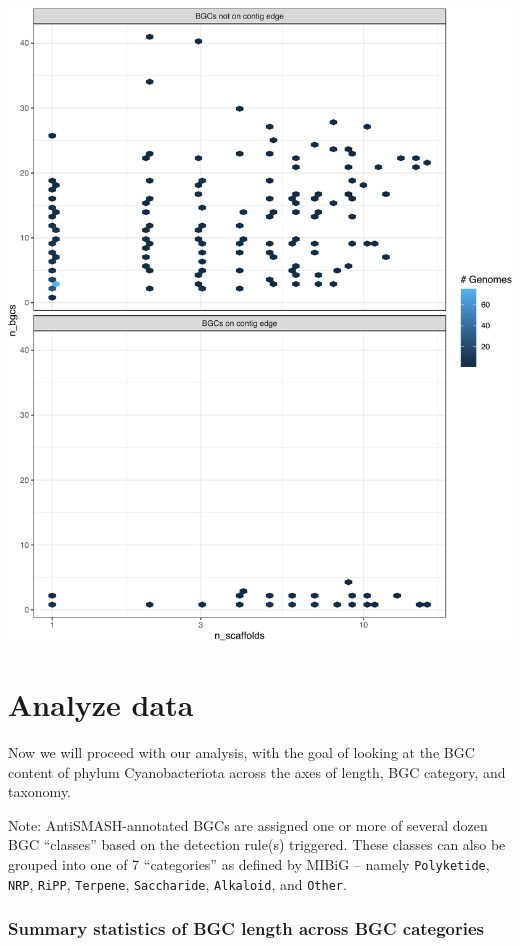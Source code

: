 \documentclass[
]{article}
\begin{document}
\includegraphics{analysis_files/figure-latex/unnamed-chunk-6-1.pdf}

\hypertarget{analyze-data}{%
\section{Analyze data}\label{analyze-data}}

Now we will proceed with our analysis, with the goal of looking at the
BGC content of phylum Cyanobacteriota across the axes of length, BGC
category, and taxonomy.

Note: AntiSMASH-annotated BGCs are assigned one or more of several dozen
BGC ``classes'' based on the detection rule(s) triggered. These classes
can also be grouped into one of 7 ``categories'' as defined by MIBiG --
namely \texttt{Polyketide}, \texttt{NRP}, \texttt{RiPP},
\texttt{Terpene}, \texttt{Saccharide}, \texttt{Alkaloid}, and
\texttt{Other}.

\hypertarget{summary-statistics-of-bgc-length-across-bgc-categories}{%
\subsubsection{Summary statistics of BGC length across BGC
categories}\label{summary-statistics-of-bgc-length-across-bgc-categories}}
\end{document}
